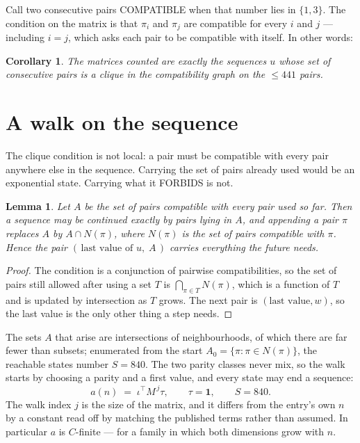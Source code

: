 \documentclass[11pt,a4paper]{article}
\theoremstyle{plain}
\newtheorem{lemma}[theorem]{Lemma}
\newtheorem{corollary}[theorem]{Corollary}
\theoremstyle{definition}
\begin{document}
Call two consecutive pairs COMPATIBLE when that number lies in $\{1,3\}$. The condition on the
matrix is that $\pi_i$ and $\pi_j$ are compatible for every $i$ and $j$ --- including $i=j$,
which asks each pair to be compatible with itself. In other words:

\begin{corollary}
The matrices counted are exactly the sequences $u$ whose set of consecutive pairs is a clique in
the compatibility graph on the $\le 441$ pairs.
\end{corollary}

\section{A walk on the sequence}

The clique condition is not local: a pair must be compatible with every pair anywhere else in
the sequence. Carrying the set of pairs already used would be an exponential state. Carrying
what it FORBIDS is not.

\begin{lemma}\label{lem:lump}
Let $A$ be the set of pairs compatible with every pair used so far. Then a sequence may be
continued exactly by pairs lying in $A$, and appending a pair $\pi$ replaces $A$ by
$A\cap N(\pi)$, where $N(\pi)$ is the set of pairs compatible with $\pi$. Hence the pair
$(\,\text{last value of }u,\;A\,)$ carries everything the future needs.
\end{lemma}

\begin{proof}
The condition is a conjunction of pairwise compatibilities, so the set of pairs still allowed
after using a set $T$ is $\bigcap_{\pi\in T}N(\pi)$, which is a function of $T$ and is updated
by intersection as $T$ grows. The next pair is $(\text{last value},w)$, so the last value is
the only other thing a step needs.
\end{proof}

The sets $A$ that arise are intersections of neighbourhoods, of which there are far fewer than
subsets; enumerated from the start $A_0=\{\pi:\pi\in N(\pi)\}$, the reachable states number
$S=840$. The two parity classes never mix, so the walk starts by choosing a parity and a first
value, and every state may end a sequence:
\[
a(n)\;=\;\iota^{\!\top}M^{\,j}\tau ,\qquad \tau=\mathbf{1},\qquad S=840.
\]
The walk index $j$ is the size of the matrix, and it differs from the entry's own $n$ by a
constant read off by matching the published terms rather than assumed. In particular $a$ is
$C$-finite --- for a family in which both dimensions grow with $n$.
\end{document}
